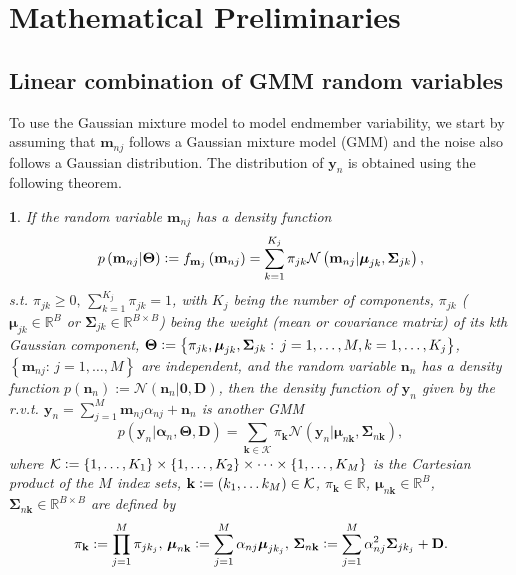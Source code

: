 \documentclass[twocolumn,english]{IEEEtran}
\theoremstyle{plain}
\newtheorem{thm}{\protect\theoremname}
\providecommand{\theoremname}{Theorem}
\begin{document}
\section{Mathematical Preliminaries\label{sec:Mathematical-Preliminary}}

\subsection{Linear combination of GMM random variables}

To use the Gaussian mixture model to model endmember variability,
we start by assuming that $\mathbf{m}_{nj}$ follows a Gaussian mixture
model (GMM) and the noise also follows a Gaussian distribution. The
distribution of $\mathbf{y}_{n}$ is obtained using the following
theorem.
\begin{thm}
\label{thm:linear_comb_GMM}If the random variable $\mathbf{m}_{nj}$
has a density function
\begin{equation}
p\left(\mathbf{m}_{nj}\vert\boldsymbol{\Theta}\right)\vcentcolon=f_{\mathbf{m}_{j}}\left(\mathbf{m}_{nj}\right)=\sum_{k=1}^{K_{j}}\pi_{jk}\mathcal{N}\left(\mathbf{m}_{nj}\vert\boldsymbol{\mu}_{jk},\boldsymbol{\Sigma}_{jk}\right),\label{eq:gmm}
\end{equation}
s.t. $\pi_{jk}\ge0,\,\sum_{k=1}^{K_{j}}\pi_{jk}=1$, with $K_{j}$
being the number of components, $\pi_{jk}$ ($\boldsymbol{\mu}_{jk}\in\mathbb{R}^{B}$
or $\boldsymbol{\Sigma}_{jk}\in\mathbb{R}^{B\times B}$) being the
weight (mean or covariance matrix) of its kth Gaussian component,
$\boldsymbol{\Theta}\vcentcolon=\left\{ \pi_{jk},\boldsymbol{\mu}_{jk},\boldsymbol{\Sigma}_{jk}:\,j=1,\dots,M,k=1,\dots,K_{j}\right\} $,
$\left\{ \mathbf{m}_{nj}:\,j=1,\dots,M\right\} $ are independent,
and the random variable $\mathbf{n}_{n}$ has a density function $p\left(\mathbf{n}_{n}\right):=\mathcal{N}\left(\mathbf{n}_{n}\vert\mathbf{0},\mathbf{D}\right)$,
then the density function of $\mathbf{y}_{n}$ given by the r.v.t.
$\mathbf{y}_{n}=\sum_{j=1}^{M}\mathbf{m}_{nj}\alpha_{nj}+\mathbf{n}_{n}$
is another GMM
\begin{equation}
p\left(\mathbf{y}_{n}\vert\boldsymbol{\alpha}_{n},\boldsymbol{\Theta},\mathbf{D}\right)=\sum_{\mathbf{k}\in\mathcal{K}}\pi_{\mathbf{k}}\mathcal{N}\left(\mathbf{y}_{n}\vert\boldsymbol{\mu}_{n\mathbf{k}},\boldsymbol{\Sigma}_{n\mathbf{k}}\right),\label{eq:density_y_theta}
\end{equation}
where $\mathcal{K}\vcentcolon=\left\{ 1,\dots,K_{1}\right\} \times\left\{ 1,\dots,K_{2}\right\} \times\cdots\times\left\{ 1,\dots,K_{M}\right\} $
is the Cartesian product of the $M$ index sets, $\mathbf{k}\vcentcolon=\left(k_{1},\dots k_{M}\right)\in\mathcal{K}$,
$\pi_{\mathbf{k}}\in\mathbb{R}$, $\boldsymbol{\mu}_{n\mathbf{k}}\in\mathbb{R}^{B}$,
$\boldsymbol{\Sigma}_{n\mathbf{k}}\in\mathbb{R}^{B\times B}$ are
defined by
\begin{equation}
\pi_{\mathbf{k}}:=\prod_{j=1}^{M}\pi_{jk_{j}},\,\boldsymbol{\mu}_{n\mathbf{k}}\vcentcolon=\sum_{j=1}^{M}\alpha_{nj}\boldsymbol{\mu}_{jk_{j}},\,\boldsymbol{\Sigma}_{n\mathbf{k}}\vcentcolon=\sum_{j=1}^{M}\alpha_{nj}^{2}\boldsymbol{\Sigma}_{jk_{j}}+\mathbf{D}.\label{eq:mu_Sigma_nk}
\end{equation}
\end{thm}
\end{document}

